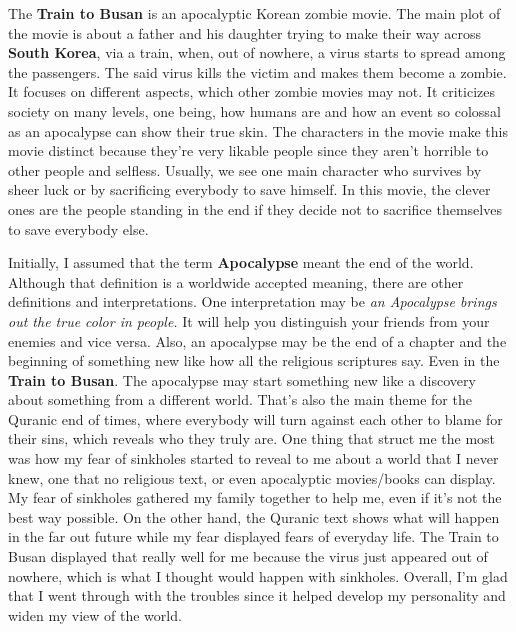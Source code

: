 \begin{essay}
  The \textbf{Train to Busan} is an apocalyptic Korean zombie movie. The main plot
  of the movie is about a father and his daughter trying to make their way across
  \textbf{South Korea}, via a train, when, out of nowhere, a virus starts to
  spread among the passengers. The said virus kills the victim and makes them
  become a zombie. It focuses on different aspects, which other zombie movies may
  not. It criticizes society on many levels, one being, how humans are and how an
  event so colossal as an apocalypse can show their true skin. The characters in
  the movie make this movie distinct because they're very likable people since
  they aren't horrible to other people and selfless. Usually, we see one main
  character who survives by sheer luck or by sacrificing everybody to save
  himself. In this movie, the clever ones are the people standing in the end if
  they decide not to sacrifice themselves to save everybody else.

  Initially, I assumed that the term \textbf{Apocalypse} meant the end of the
  world. Although that definition is a worldwide accepted meaning, there are other
  definitions and interpretations. One interpretation may be \textit{an Apocalypse
  brings out the true color in people.} It will help you distinguish your friends
  from your enemies and vice versa. Also, an apocalypse may be the end of a
  chapter and the beginning of something new like how all the religious scriptures
  say. Even in the \textbf{Train to Busan}. The apocalypse may start something new
  like a discovery about something from a different world. That's also the main
  theme for the Quranic end of times, where everybody will turn against each
  other to blame for their sins, which reveals who they truly are. One thing
  that struct me the most was how my fear of sinkholes started to reveal to me
  about a world that I never knew, one that no religious text, or even
  apocalyptic movies/books can display. My fear of sinkholes gathered my family
  together to help me, even if it's not the best way possible. On the other
  hand, the Quranic text shows what will happen in the far out future while my
  fear displayed fears of everyday life. The Train to Busan displayed that
  really well for me because the virus just appeared out of nowhere, which is
  what I thought would happen with sinkholes. Overall, I'm glad that I went
  through with the troubles since it helped develop my personality and widen my
  view of the world.
\end{essay}
